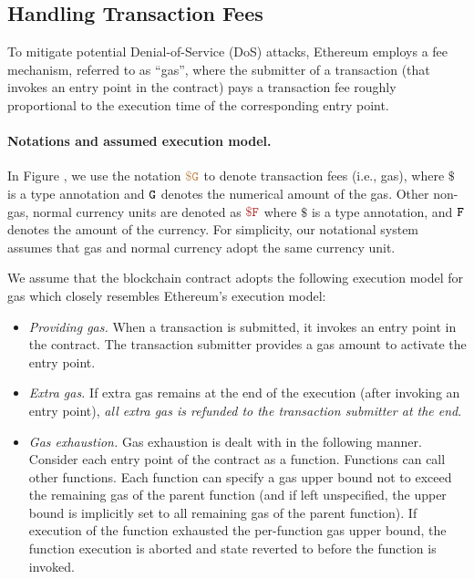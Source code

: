 


\subsection{Handling Transaction Fees}

To mitigate potential Denial-of-Service (DoS) attacks, 
Ethereum employs a fee mechanism, referred to as ``gas'', 
where the submitter of a transaction (that invokes
an entry point in the contract) pays a  
transaction fee
roughly proportional to the execution time of the 
corresponding entry point.

\paragraph{Notations and assumed execution model.}
In Figure , we
use the notation $\tt {\color{brown} \$ G }$
to denote transaction fees (i.e., gas), 
where $\$$ is a type annotation 
and ${\tt G}$ denotes the numerical amount of the  
gas. Other non-gas, normal currency units 
are denoted as $\smaroon{\$ F}$ where $\$$ is a type annotation,
and ${\tt F}$ denotes the amount of the currency. 
For simplicity, our notational system assumes 
that gas and normal currency adopt
the same currency unit. 

We assume that the blockchain contract adopts the following execution model
for gas which closely resembles Ethereum's execution model:
\begin{itemize}[leftmargin=5mm]
\item
{\it Providing gas.} 
When a transaction is submitted, it invokes an entry point in the contract.
The transaction submitter provides a gas amount to activate the entry point. 
\item
{\it Extra gas.} 
If extra gas remains at the end of the execution (after invoking an entry point),
{\it all extra gas is refunded to the transaction submitter at the end}.
\item
{\it Gas exhaustion.} 
Gas exhaustion is dealt with in the following manner.
Consider each entry point of the contract as a function. 
Functions can call other functions.
Each function can specify a gas upper bound not to exceed
the remaining gas of the parent function (and if left unspecified,
the upper bound is implicitly set to all remaining gas of the parent function).
If execution of the function exhausted the per-function gas 
upper bound, the function execution is aborted and 
state reverted to before the function is invoked.
\end{itemize}

